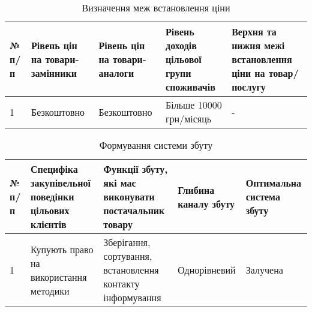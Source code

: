 \begin{table}
	\begin{tabularx}{\textwidth}{|l|X|X|X|X|}
    \hline
    № п/п & Рівень цін на товари-замінники & Рівень цін на товари-аналоги & Рівень доходів цільової групи споживачів & Верхня та нижня межі встановлення ціни на товар/послугу \\ \hline
    1 & Безкоштовно & Безкоштовно & Більше 10000 грн/місяць & - \\
    \hline
    \end{tabularx}
\caption{Визначення меж встановлення ціни} \label{tab:sometab}
\end{table}

\begin{table}
	\begin{tabularx}{\textwidth}{|l|X|X|X|X|}
    \hline
    № п/п & Специфіка закупівельної поведінки цільових клієнтів & Функції збуту, які має виконувати постачальник товару & Глибина каналу збуту & Оптимальна система збуту \\ \hline
    1 & Купують право на використання методики & Зберігання, сортування, встановлення контакту інформування & Однорівневий & Залучена \\
    \hline
    \end{tabularx}
\caption{Формування системи збуту} \label{tab:sometab}
\end{table}